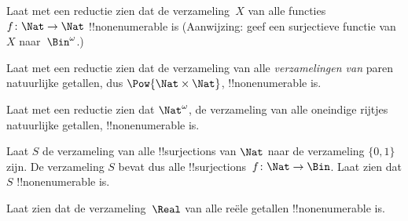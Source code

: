 \documentclass[../../../include/open-logic-section]{subfiles}
\begin{document}
\begin{prob}\label{sfr:siz:red:prob:nat-nat}
  Laat met een reductie zien dat de verzameling~$X$ van alle functies
  $f\colon \Nat \to \Nat$ !!{nonenumerable} is (Aanwijzing: geef een
  surjectieve functie van $X$ naar~$\Bin^\omega$.)
\end{prob}

\begin{prob}
Laat met een reductie zien dat de verzameling van alle
\emph{verzamelingen van} paren natuurlijke getallen, dus
$\Pow{\Nat \times \Nat}$, !!{nonenumerable} is.
\end{prob}

\begin{prob}
Laat met een reductie zien dat $\Nat^\omega$, de verzameling van alle
oneindige rijtjes natuurlijke getallen, !!{nonenumerable} is.
\end{prob}


\begin{prob}
Laat $S$ de verzameling van alle !!{surjection}s van $\Nat$ naar de
verzameling $\{0,1\}$ zijn. De verzameling $S$ bevat dus alle
!!{surjection}s~$f \colon \Nat \to \Bin$. Laat zien dat $S$
!!{nonenumerable} is.
\end{prob}

\begin{prob}
Laat zien dat de verzameling~$\Real$ van alle reële getallen
!!{nonenumerable} is.
\end{prob}
\end{document}
